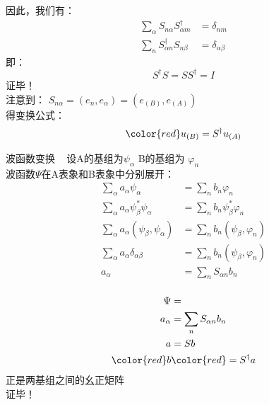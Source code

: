\begin{frame} 
    因此，我们有：
    \begin{equation*}
        \begin{split}
            \sum_{\alpha} S_{n\alpha}   S^{\dagger } _{\alpha m} &=\delta_{nm} \\
            \sum_{n} S^{\dagger } _{\alpha n} S_{n\beta}&=\delta_{\alpha\beta}
        \end{split} 
    \end{equation*}
    即：$$ S^{\dagger }S=SS^{\dagger } =I$$ 
    证毕！ \\

    注意到： $ S_{n\alpha} = (e_n, e_\alpha)= (e_{(B)}, e_{(A)})$ \\
    得变换公式： $$ \color{red} u_{(B)}= S^{\dagger} u_ {(A)}$$
\end{frame}


\begin{frame} {波函数变换}
    \例[3.试证明同一波函数在两不同表象中的矩阵之间的变换是幺正变换]{}  
    \证~ 设A的基组为$\psi_\alpha$ B的基组为 $\varphi_n$\\
    波函数$\Psi$在A表象和B表象中分别展开：
    \begin{equation*}
        \begin{split}
            \sum_\alpha a_\alpha \psi_\alpha &= \sum_n b_n \varphi_n \\
            \sum_\alpha a_\alpha \psi_\beta ^* \psi_\alpha &= \sum_n b_n \psi_\beta ^* \varphi_n \\
            \sum_\alpha a_\alpha (\psi_\beta, \psi_\alpha) &= \sum_n b_n (\psi_\beta, \varphi_n) \\
            \sum_\alpha a_\alpha \delta_{\alpha\beta} &= \sum_n b_n (\psi_\beta, \varphi_n) \\
            a_\alpha &= \sum_n S_{\alpha n} b_n\\
        \end{split} 
    \end{equation*}
\end{frame}

\begin{frame} 
    \begin{equation*}
        \begin{split}
            \Psi &= \\
            a_\alpha &= \sum_n S_{\alpha n} b_n\\
            a&=Sb\\
            \color{red} b& \color{red}=S^{\dagger}a   
        \end{split} 
    \end{equation*}
    正是两基组之间的幺正矩阵\\
    证毕！\\
\end{frame}


